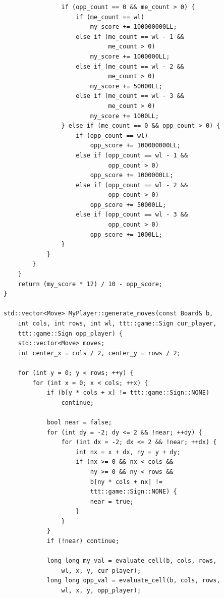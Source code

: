 \documentclass[a4paper,14pt]{extreport}
\begin{document}
\begin{lstlisting}
                if (opp_count == 0 && me_count > 0) {
                    if (me_count == wl) 
                        my_score += 100000000LL;
                    else if (me_count == wl - 1 && 
                             me_count > 0) 
                        my_score += 1000000LL;
                    else if (me_count == wl - 2 && 
                             me_count > 0) 
                        my_score += 50000LL;
                    else if (me_count == wl - 3 && 
                             me_count > 0) 
                        my_score += 1000LL;
                } else if (me_count == 0 && opp_count > 0) {
                    if (opp_count == wl) 
                        opp_score += 100000000LL;
                    else if (opp_count == wl - 1 && 
                             opp_count > 0) 
                        opp_score += 1000000LL;
                    else if (opp_count == wl - 2 && 
                             opp_count > 0) 
                        opp_score += 50000LL;
                    else if (opp_count == wl - 3 && 
                             opp_count > 0) 
                        opp_score += 1000LL;
                }
            }
        }
    }
    return (my_score * 12) / 10 - opp_score; 
}

std::vector<Move> MyPlayer::generate_moves(const Board& b, 
    int cols, int rows, int wl, ttt::game::Sign cur_player, 
    ttt::game::Sign opp_player) {
    std::vector<Move> moves;
    int center_x = cols / 2, center_y = rows / 2;
    
    for (int y = 0; y < rows; ++y) {
        for (int x = 0; x < cols; ++x) {
            if (b[y * cols + x] != ttt::game::Sign::NONE) 
                continue;
            
            bool near = false;
            for (int dy = -2; dy <= 2 && !near; ++dy) {
                for (int dx = -2; dx <= 2 && !near; ++dx) {
                    int nx = x + dx, ny = y + dy;
                    if (nx >= 0 && nx < cols && 
                        ny >= 0 && ny < rows && 
                        b[ny * cols + nx] != 
                        ttt::game::Sign::NONE) {
                        near = true;
                    }
                }
            }
            if (!near) continue;
            
            long long my_val = evaluate_cell(b, cols, rows, 
                wl, x, y, cur_player);
            long long opp_val = evaluate_cell(b, cols, rows, 
                wl, x, y, opp_player);
            

\end{lstlisting}
\end{document}
